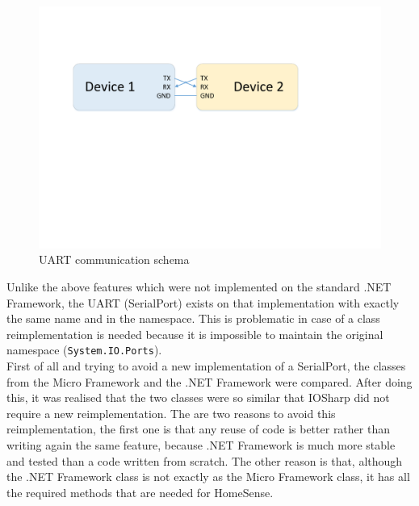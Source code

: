 \begin{figure}[H]\begin{center}
 \centering
  \captionsetup{justification=centering}
  \includegraphics[scale=0.60]{pictures/iosharp/uart-modules}
  \caption{UART communication schema\label{fig:uart-modules}}
\end{center}\end{figure}

Unlike the above features which were not implemented on the standard .NET Framework, the UART (SerialPort) exists on that implementation with exactly the same name and in the namespace. This is problematic in case of a class reimplementation is needed because it is impossible to maintain the original namespace (\verb!System.IO.Ports!).
\\
First of all and trying to avoid a new implementation of a SerialPort, the classes from the Micro Framework and the .NET Framework were compared. After doing this, it was realised that the two classes were so similar that IOSharp did not require a new reimplementation. The are two reasons to avoid this reimplementation, the first one is that any reuse of code is better rather than writing again the same feature, because .NET Framework is much more stable and tested than a code written from scratch. The other reason is that, although the .NET Framework class is not exactly as the Micro Framework class, it has all the required methods that are needed for HomeSense.

